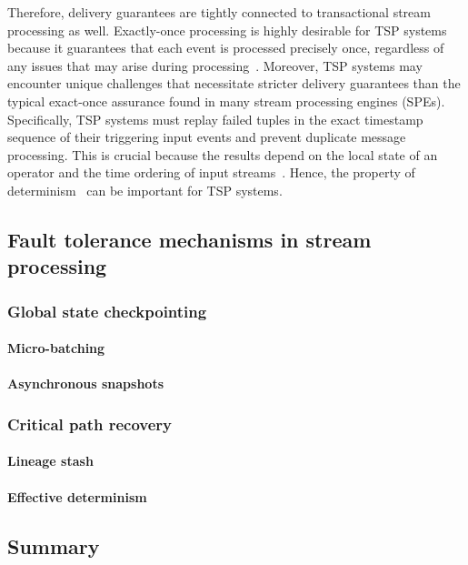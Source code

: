 Therefore, delivery guarantees are tightly connected to transactional stream processing as well. Exactly-once processing is highly desirable for TSP systems because it guarantees that each event is processed precisely once, regardless of any issues that may arise during processing~\cite{zhang2024survey}. Moreover, TSP systems may encounter unique challenges that necessitate stricter delivery guarantees than the typical exact-once assurance found in many stream processing engines (SPEs). Specifically, TSP systems must replay failed tuples in the exact timestamp sequence of their triggering input events and prevent duplicate message processing. This is crucial because the results depend on the local state of an operator and the time ordering of input streams~\cite{zhang2024survey}. Hence, the property of determinism~\cite{thepaper, Zacheilas:2017:MDS:3093742.3093921, } can be important for TSP systems.


\subsection{Fault tolerance mechanisms in stream processing}
\label{phd-related-fault-tolerance}

\subsubsection{Global state checkpointing}

\paragraph{Micro-batching}
\cite{Zaharia:2012:DSE:2342763.2342773}

\paragraph{Asynchronous snapshots}
\cite{Carbone:2017:SMA:3137765.3137777}

\subsubsection{Critical path recovery}

\paragraph{Lineage stash}
\cite{Wang:2019:LSF:3341301.3359653}

\paragraph{Effective determinism}
\cite{Akidau:2013:MFS:2536222.2536229, silvestre2021clonos}

\subsection{Summary}
\label{review_summary}